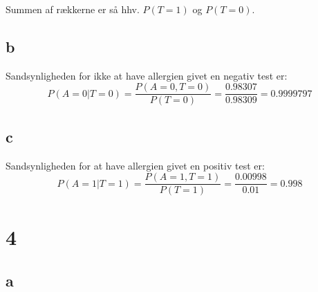\documentclass[11pt]{article}
\begin{document}
Summen af rækkerne er så hhv. \(P(T=1)\) og \(P(T=0)\).
\subsection{b}
\label{sec:orge5eaf04}
Sandsynligheden for ikke at have allergien givet en negativ test er:
\[P(A=0|T=0)=\frac{P(A=0,T=0)}{P(T=0)}=\frac{0.98307}{0.98309}= 0.9999797\]
\subsection{c}
\label{sec:orgf601823}
Sandsynligheden for at have allergien givet en positiv test er:
\[P(A=1|T=1)=\frac{P(A=1,T=1)}{P(T=1)}=\frac{0.00998}{0.01}= 0.998\]


\section{4}
\label{sec:org06aa44c}
\subsection{a}
\label{sec:org7ec5895}
\end{document}
